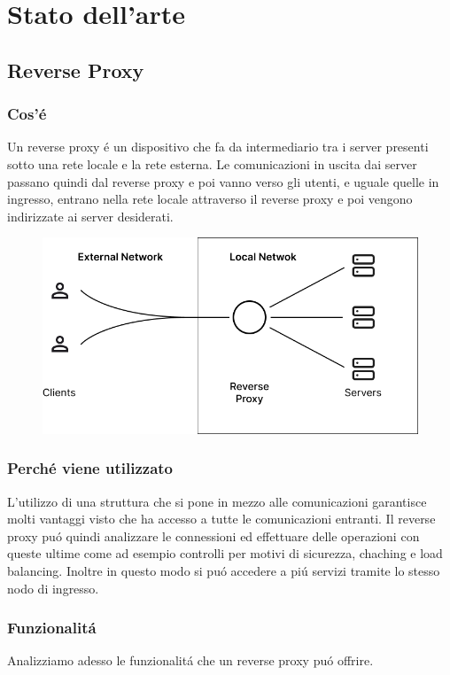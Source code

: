 \chapter{Stato dell'arte}
\label{cha:statoArte}

\section{Reverse Proxy}
\subsection{Cos'é}
Un reverse proxy é un dispositivo che fa da intermediario tra i server presenti sotto una rete locale e la rete esterna. Le comunicazioni in uscita dai server passano quindi dal reverse proxy e poi vanno verso gli utenti, e uguale quelle in ingresso, entrano nella rete locale attraverso il reverse proxy e poi vengono indirizzate ai server desiderati.
\begin{figure}[h!]
  \centering
  \includegraphics[width=.6\textwidth]{images/schema.png}
\end{figure}

\subsection{Perché viene utilizzato}
L'utilizzo di una struttura che si pone in mezzo alle comunicazioni garantisce molti vantaggi visto che ha accesso a tutte le comunicazioni entranti. Il reverse proxy puó quindi analizzare le connessioni ed effettuare delle operazioni con queste ultime come ad esempio controlli per motivi di sicurezza, chaching e load balancing. Inoltre in questo modo si puó accedere a piú servizi tramite lo stesso nodo di ingresso.

\subsection{Funzionalitá}
Analizziamo adesso le funzionalitá che un reverse proxy puó offrire.

